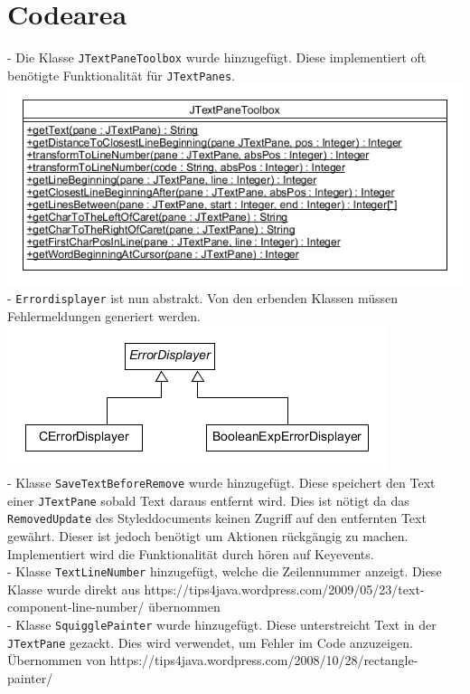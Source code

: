 \documentclass[a4paper]{scrreprt}
\begin{document}
\section{Codearea}
- Die Klasse \verb!JTextPaneToolbox! wurde hinzugefügt. Diese implementiert oft benötigte Funktionalität für \verb!JTextPanes!.\\
\includegraphics[scale=0.5]{JTextPaneToolbox.png}\\
- \verb!Errordisplayer! ist nun abstrakt. Von den erbenden Klassen müssen Fehlermeldungen generiert werden.\\
\includegraphics[scale=0.5]{Errordisplayer_update.png}\\
- Klasse \verb!SaveTextBeforeRemove! wurde hinzugefügt. Diese speichert den Text einer \verb!JTextPane! sobald Text daraus entfernt wird. Dies ist nötigt da das \verb!RemovedUpdate! des Styleddocuments keinen Zugriff auf den entfernten Text gewährt. Dieser ist jedoch benötigt um Aktionen rückgängig zu machen. Implementiert wird die Funktionalität durch hören auf Keyevents.\\
- Klasse \verb!TextLineNumber! hinzugefügt, welche die Zeilennummer anzeigt. Diese Klasse wurde direkt aus https://tips4java.wordpress.com/2009/05/23/text-component-line-number/ übernommen\\
- Klasse \verb!SquigglePainter! wurde hinzugefügt. Diese unterstreicht Text in der \verb!JTextPane! gezackt. Dies wird verwendet, um Fehler im Code anzuzeigen. Übernommen von 
https://tips4java.wordpress.com/2008/10/28/rectangle-painter/\\
\end{document}
